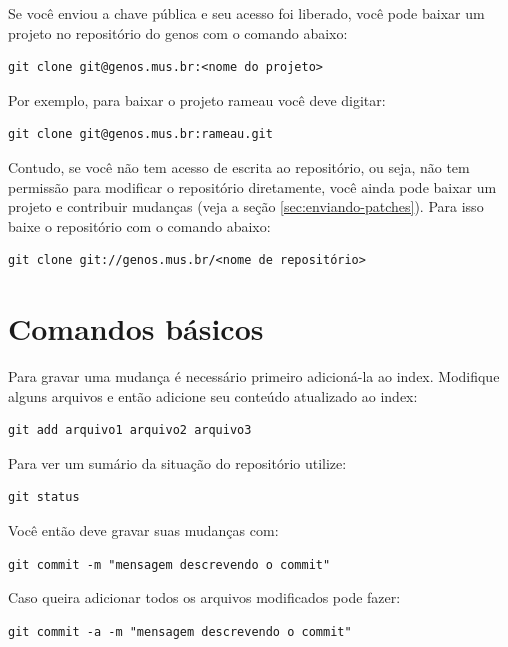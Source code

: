 \documentclass[12pt,brazil]{book}
\begin{document}
Se você enviou a chave pública e seu acesso foi liberado, você pode
baixar um projeto no repositório do genos com o comando abaixo:

\begin{verbatim}
git clone git@genos.mus.br:<nome do projeto>
\end{verbatim}

Por exemplo, para baixar o projeto rameau você deve
digitar:

\begin{verbatim}
git clone git@genos.mus.br:rameau.git
\end{verbatim}

Contudo, se você não tem acesso de escrita ao repositório, ou seja,
não tem permissão para modificar o repositório diretamente, você ainda
pode baixar um projeto e contribuir mudanças (veja a seção
\ref{sec:enviando-patches}). Para isso baixe o repositório com o
comando abaixo:

\begin{verbatim}
git clone git://genos.mus.br/<nome de repositório>
\end{verbatim}

\section{Comandos básicos}
\label{sec:comandos-basicos}

Para gravar uma mudança é necessário primeiro adicioná-la ao
index. Modifique alguns arquivos e então adicione seu conteúdo
atualizado ao index:

\begin{verbatim}
git add arquivo1 arquivo2 arquivo3
\end{verbatim}

Para ver um sumário da situação do repositório utilize:

\begin{verbatim}
git status
\end{verbatim}

Você então deve gravar suas mudanças com:

\begin{verbatim}
git commit -m "mensagem descrevendo o commit"
\end{verbatim}

Caso queira adicionar todos os arquivos modificados pode fazer:

\begin{verbatim}
git commit -a -m "mensagem descrevendo o commit"
\end{verbatim}
\end{document}
